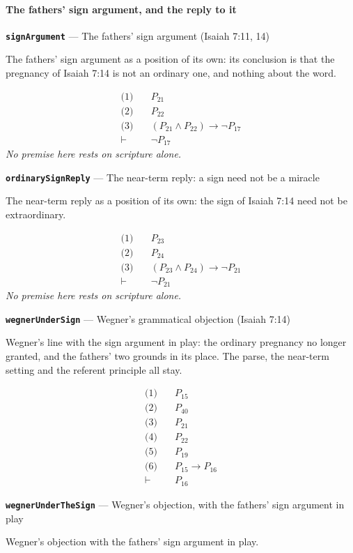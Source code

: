 \documentclass[11pt]{article}
\begin{document}
\paragraph*{The fathers' sign argument, and the reply to it}
\leavevmode\par
\par\medskip\noindent\textbf{\texttt{sign\allowbreak{}Argument}} --- The fathers' sign argument (Isaiah 7:11, 14)\par\nobreak\noindent
The fathers' sign argument as a position of its own: its conclusion is that the pregnancy of Isaiah 7:14 is not an ordinary one, and nothing about the word.

\begin{align*}
  \text{(1)} \quad & P_{21} \\
  \text{(2)} \quad & P_{22} \\
  \text{(3)} \quad & (P_{21} \land P_{22}) \rightarrow \lnot P_{17} \\
  \vdash \quad & \lnot P_{17}
\end{align*}
\emph{No premise here rests on scripture alone.}
\par\medskip\noindent\textbf{\texttt{ordinary\allowbreak{}Sign\allowbreak{}Reply}} --- The near-term reply: a sign need not be a miracle\par\nobreak\noindent
The near-term reply as a position of its own: the sign of Isaiah 7:14 need not be extraordinary.

\begin{align*}
  \text{(1)} \quad & P_{23} \\
  \text{(2)} \quad & P_{24} \\
  \text{(3)} \quad & (P_{23} \land P_{24}) \rightarrow \lnot P_{21} \\
  \vdash \quad & \lnot P_{21}
\end{align*}
\emph{No premise here rests on scripture alone.}
\par\medskip\noindent\textbf{\texttt{wegner\allowbreak{}Under\allowbreak{}Sign}} --- Wegner's grammatical objection (Isaiah 7:14)\par\nobreak\noindent
Wegner's line with the sign argument in play: the ordinary pregnancy no longer granted, and the fathers' two grounds in its place. The parse, the near-term setting and the referent principle all stay.

\begin{align*}
  \text{(1)} \quad & P_{15} \\
  \text{(2)} \quad & P_{40} \\
  \text{(3)} \quad & P_{21} \\
  \text{(4)} \quad & P_{22} \\
  \text{(5)} \quad & P_{19} \\
  \text{(6)} \quad & P_{15} \rightarrow P_{16} \\
  \vdash \quad & P_{16}
\end{align*}
\par\medskip\noindent\textbf{\texttt{wegner\allowbreak{}Under\allowbreak{}The\allowbreak{}Sign}} --- Wegner's objection, with the fathers' sign argument in play\par\nobreak\noindent
Wegner's objection with the fathers' sign argument in play.
\end{document}
